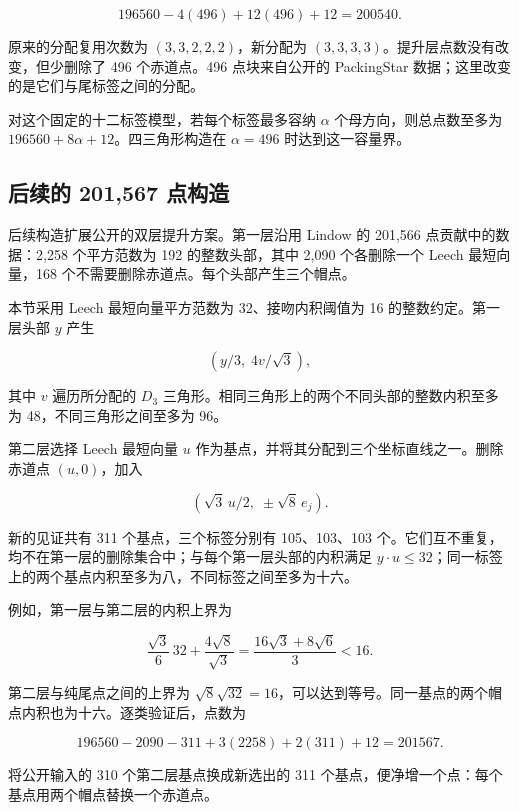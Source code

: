 \[
196560-4(496)+12(496)+12=200540.
\]

原来的分配复用次数为 \((3,3,2,2,2)\)，新分配为
\((3,3,3,3)\)。提升层点数没有改变，但少删除了 496 个赤道点。496
点块来自公开的 PackingStar 数据；这里改变的是它们与尾标签之间的分配。

对这个固定的十二标签模型，若每个标签最多容纳 \(\alpha\)
个母方向，则总点数至多为 \(196560+8\alpha+12\)。四三角形构造在
\(\alpha=496\) 时达到这一容量界。

\subsection{后续的 201,567
点构造}

后续构造扩展公开的双层提升方案。第一层沿用 Lindow 的 201,566
点贡献中的数据：2,258 个平方范数为 192 的整数头部，其中 2,090
个各删除一个 Leech 最短向量，168
个不需要删除赤道点。每个头部产生三个帽点。

本节采用 Leech 最短向量平方范数为 32、接吻内积阈值为 16
的整数约定。第一层头部 \(y\) 产生

\[
(y/3,\;4v/\sqrt3),
\]

其中 \(v\) 遍历所分配的 \(D_3\)
三角形。相同三角形上的两个不同头部的整数内积至多为
48，不同三角形之间至多为 96。

第二层选择 Leech 最短向量 \(u\)
作为基点，并将其分配到三个坐标直线之一。删除赤道点 \((u,0)\)，加入

\[
(\sqrt3\,u/2,\;\pm\sqrt8\,e_j).
\]

新的见证共有 311 个基点，三个标签分别有 105、103、103
个。它们互不重复，均不在第一层的删除集合中；与每个第一层头部的内积满足
\(y\cdot u\le32\)；同一标签上的两个基点内积至多为八，不同标签之间至多为十六。

例如，第一层与第二层的内积上界为

\[
\frac{\sqrt3}{6}\,32+\frac{4\sqrt8}{\sqrt3}
=\frac{16\sqrt3+8\sqrt6}{3}<16.
\]

第二层与纯尾点之间的上界为
\(\sqrt8\sqrt{32}=16\)，可以达到等号。同一基点的两个帽点内积也为十六。逐类验证后，点数为

\[
196560-2090-311+3(2258)+2(311)+12=201567.
\]

将公开输入的 310 个第二层基点换成新选出的 311
个基点，便净增一个点：每个基点用两个帽点替换一个赤道点。
